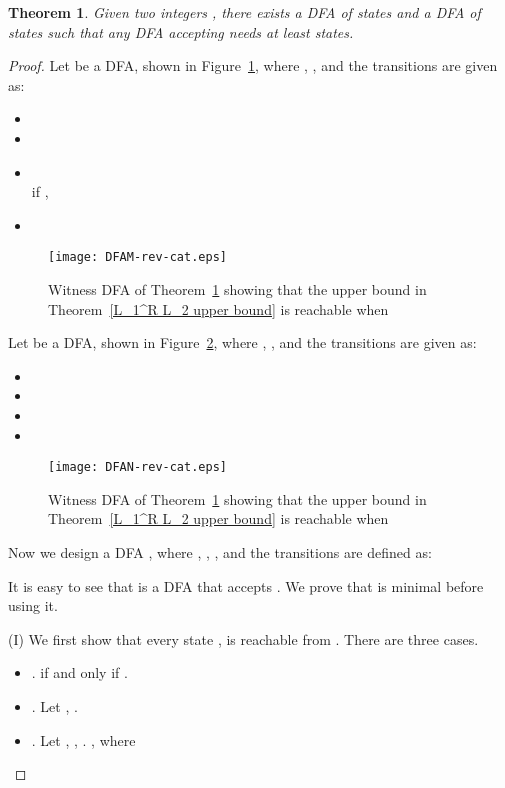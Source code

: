 \documentclass[10pt]{article}
\newtheorem{theorem}{Theorem}
\begin{document}
\begin{theorem}
\label{L_1^R L_2 lower bound} Given two integers , there
exists a DFA  of  states and a DFA  of  states such that
any DFA accepting  needs at least 
states.
\end{theorem}
\begin{proof}
Let  be a DFA, shown in
Figure~\ref{DFAM-rev-cat}, where ,
, and the transitions are given as:
\begin{itemize}
\item 
\item  
\item  \\
 if , 
\item 
\end{itemize}
\begin{figure}[ht]
  \begin{center}
  \texttt{[image: DFAM-rev-cat.eps]}
  \end{center}
  \caption{Witness DFA  of Theorem~\ref{L_1^R L_2 lower bound} showing that the upper bound in Theorem~\ref{L_1^R L_2 upper bound} is reachable when }
\label{DFAM-rev-cat}
\end{figure}

Let  be a DFA, shown in
Figure~\ref{DFAN-rev-cat}, where ,
, and the transitions are given as:
\begin{itemize}
\item 
\item 
\item 
\item 
\end{itemize}
\begin{figure}[ht]
  \begin{center}
  \texttt{[image: DFAN-rev-cat.eps]}
  \end{center}
  \caption{Witness DFA  of Theorem~\ref{L_1^R L_2 lower bound} showing that the upper bound in Theorem~\ref{L_1^R L_2 upper bound} is reachable when }
\label{DFAN-rev-cat}
\end{figure}
Now we design a DFA ,
where , ,
, and the transitions are
defined as:

It is easy to see that  is a DFA that accepts . We prove
that  is minimal before using it.

(I) We first show that every state , is reachable from
. There are three cases.


\begin{itemize}
\item[{\rm 1.}].
 if and only if . 
\item[{\rm 2.}].
Let , . 
\item[{\rm 3.}].
Let , , . , where


\end{itemize}
\end{proof}
\end{document}
